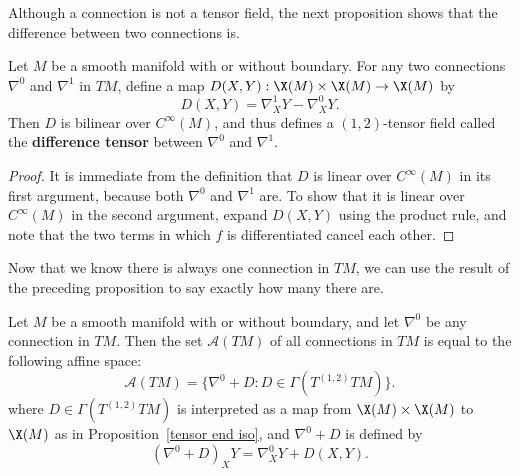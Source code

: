 Although a connection is not a tensor field, the next proposition shows that the difference 
between two connections is.
\begin{proposition}\label{connection difference tensor}
Let $M$ be a smooth manifold with or without boundary. For any two connections $\nabla^0$ 
and $\nabla^1$ in $TM$, define a map $D(X,Y):\X(M)\times\X(M)\to\X(M)$ by
\[D(X,Y)=\nabla^1_XY-\nabla^0_XY.\]
Then $D$ is bilinear over $C^\infty(M)$, and thus defines a $(1,2)$-tensor field called the 
\textbf{difference tensor} between $\nabla^0$ and $\nabla^1$.
\end{proposition}
\begin{proof}
It is immediate from the definition that $D$ is linear over $C^{\infty}(M)$ in its first 
argument, because both $\nabla^0$ and $\nabla^1$ are. To show that it is linear over $C^{\infty}(M)$ 
in the second argument, expand $D(X,Y)$ using the product rule, and note that the two terms 
in which $f$ is differentiated cancel each other.
\end{proof}
Now that we know there is always one connection in $TM$, we can use the result of the 
preceding proposition to say exactly how many there are.
\begin{proposition}\label{connection affine space}
Let $M$ be a smooth manifold with or without boundary, and let $\nabla^0$ be any connection 
in $TM$. Then the set $\mathcal{A}(TM)$ of all connections in $TM$ is equal to the following 
affine space:
\[\mathcal{A}(TM)=\{\nabla^0+D:D\in\Gamma(T^{(1,2)}TM)\}.\]
where $D\in\Gamma(T^{(1,2)}TM)$ is interpreted as a map from $\X(M)\times\X(M)$ to $\X(M)$ as 
in Proposition~\ref{tensor end iso}, and $\nabla^0+D$ is defined by
\[(\nabla^0+D)_XY=\nabla^0_XY+D(X,Y).\]
\end{proposition}
